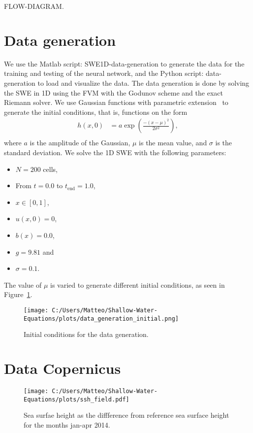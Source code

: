 FLOW-DIAGRAM.


\section{Data generation}
We use the Matlab script: SWE1D-data-generation to generate the data for the training and testing of the neural network, and the Python script: data-generation to load and visualize the data.
The data generation is done by solving the SWE in 1D using the FVM with the Godunov scheme and the exact Riemann solver.
We use Gaussian functions with parametric extension~\cite{Gaussian} to generate the initial conditions, that is, functions on the form
\begin{align*}
    h(x,0) &= a \exp{\left(\frac{-{(x-\mu)}^2}{2\sigma^2}\right)}, \\
\end{align*}
where $a$ is the amplitude of the Gaussian, $\mu$ is the mean value, and $\sigma$ is the standard deviation.
We solve the 1D SWE with the following parameters:
\begin{itemize}
    \item $N = 200$ cells,
    \item From $t = 0.0$ to $t_{\text{end}} = 1.0$,
    \item $x \in [0, 1]$,
    \item $u(x,0) = 0$,
    \item $b(x) = 0.0$,
    \item $g = 9.81$ and
    \item $\sigma = 0.1$.
\end{itemize}
The value of $\mu$ is varied to generate different initial conditions, as seen in Figure~\ref{fig:data_generation_initial}.
\begin{figure}[H]
    \centering
    \texttt{[image: C:/Users/Matteo/Shallow-Water-Equations/plots/data\_generation\_initial.png]}
    \caption{Initial conditions for the data generation.}\label{fig:data_generation_initial}
\end{figure}


\section{Data Copernicus}

\begin{figure}[H]
    \centering
    \texttt{[image: C:/Users/Matteo/Shallow-Water-Equations/plots/ssh\_field.pdf]}
    \caption{Sea surfae height as the diffference from reference sea surface height for the months jan-apr 2014.}\label{fig:copernices-ssh}
\end{figure}



